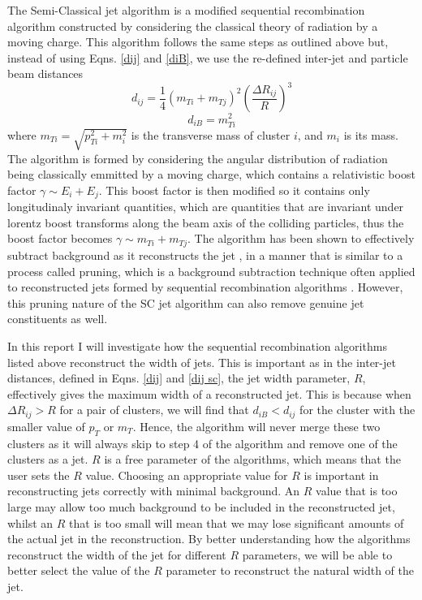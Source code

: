 \documentclass[a4paper,11pt, onecolumn]{article}
\begin{document}
 The Semi-Classical jet algorithm \cite{sc} is a modified sequential recombination algorithm constructed by 
 considering the classical theory of radiation by a moving charge. This algorithm follows the same steps as outlined
 above but, instead of using Eqns. \eqref{dij} and \eqref{diB}, we use the re-defined inter-jet and particle beam distances
 \begin{equation}
   d_{ij} = \frac{1}{4} (m_{Ti} + m_{Tj})^2 \left( \frac{\Delta R_{ij}}{R} \right) ^3 \label{dij sc}
 \end{equation}
 \begin{equation}
   d_{iB} = m_{Ti}^2 \label{diB sc}
  \end{equation}
  where $m_{Ti} = \sqrt{p_{Ti}^2 + m_i^2}$ is the transverse mass of cluster $i$, and $m_i$ is its mass. The algorithm is formed by considering the angular distribution
  of radiation being  classically emmitted by a moving charge, which contains a relativistic boost factor $\gamma \sim E_i + E_j$. This boost factor is then modified so it
  contains only longitudinaly invariant quantities, which are quantities that are invariant under lorentz boost transforms along the beam axis of the
  colliding particles, thus the boost factor becomes $\gamma \sim m_{Ti} + m_{Tj}$. The algorithm has been shown to effectively subtract background as it reconstructs the jet \cite{sc},
  in a manner that is similar to a process called pruning, which is a background subtraction technique often applied to reconstructed jets formed by sequential 
  recombination algorithms \cite{pruning}. However, this pruning nature of the SC jet algorithm can also remove genuine jet constituents as well.  
  \newline

  In this report I will investigate how the sequential recombination algorithms listed above reconstruct the width of jets. This is important as in 
  the inter-jet distances, defined in Eqns. \eqref{dij} and \eqref{dij sc}, the jet width parameter, $R$, effectively gives the maximum width of a reconstructed jet.
  This is because when $\Delta R_{ij} > R$ for a pair of clusters, we will find that $d_{iB} < d_{ij}$ for the cluster with the smaller value of ${p_T}$ or ${m_T}$.
  Hence, the algorithm will never merge these two clusters as it will always skip to step 4 of the algorithm and remove one of the clusters as a jet. $R$
  is a free parameter of the algorithms, which means that the user sets the $R$ value. Choosing an appropriate value for $R$ 
  is important in reconstructing jets correctly with minimal background. An $R$ value 
  that is too large may allow too much background to be included in the reconstructed jet, whilst an $R$ that is too small will mean that we may lose
  significant amounts of the actual jet in the reconstruction. By better understanding how the algorithms reconstruct the width of the jet for different $R$ parameters,
  we will be able to better select the value of the $R$ parameter to reconstruct the natural width of the jet.
  \newline
\end{document}
